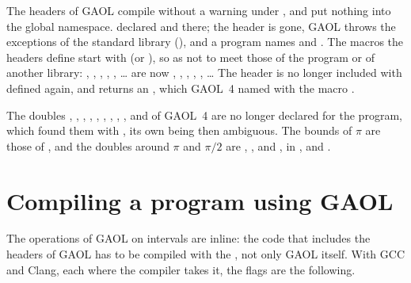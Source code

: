 \documentclass[12pt,a4paper,twoside,openright]{book}
\begin{document}
\medskip
The headers of GAOL compile without a warning under , and put nothing into the global namespace.
 declared  and 
there; the header is gone, GAOL throws the exceptions of the standard library
(), and a program names  and
.\newinvfive{} The macros the headers define start with
 (or ), so as not to meet those of the program or of
another library:\newinvfive{} ,
, , ,
, \ldots{} are now
, ,
, , ,
\ldots{} The header  is no longer included
with  defined again, and 
returns an , which GAOL~4 named with the macro
.

\medskip
The doubles , , , ,
, , , ,
,  and  of GAOL~4 are
no longer declared for the program, which found them with , its own  being then ambiguous.\newinvfive{} The
bounds of $\pi$ are those of , and the doubles around
$\pi$ and $\pi/2$ are , ,
 and , in ,
 and .

\section{Compiling a program using GAOL}\label{sec:compiling}
%
%

The operations of GAOL on intervals are inline: the code that includes the
headers of GAOL has to be compiled with the , not only GAOL itself.\newinvfive{} With GCC and Clang, each where
the compiler takes it, the flags are the following.
\end{document}
